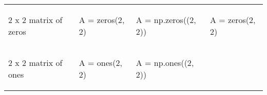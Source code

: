 \documentclass[10pt, landscape]{article}
\newenvironment{Shaded}{}{}
\newcommand{\DecValTok}[1]{\textcolor[rgb]{0.25,0.63,0.44}{{#1}}}
\newcommand{\FloatTok}[1]{\textcolor[rgb]{0.25,0.63,0.44}{{#1}}}
\newcommand{\OperatorTok}[1]{\textcolor[rgb]{0.40,0.40,0.40}{{#1}}}
\newcommand{\NormalTok}[1]{{#1}}
\begin{document}
\begin{multicols*}{2}
\begin{table}[ht]
\begin{tabular}[ ]{@{}llll@{}}
\begin{minipage}[t]{0.24\columnwidth}
2 x 2 matrix of zeros\strut
\end{minipage} & \begin{minipage}[t]{0.20\columnwidth}\raggedright\strut
\begin{Shaded}
\begin{Highlighting}[]
\NormalTok{A = zeros(}\FloatTok{2}\NormalTok{, }\FloatTok{2}\NormalTok{)}
\end{Highlighting}
\end{Shaded}
\strut
\end{minipage} & \begin{minipage}[t]{0.25\columnwidth}\raggedright\strut
\begin{Shaded}
\begin{Highlighting}[]
\NormalTok{A }\OperatorTok{=} \NormalTok{np.zeros((}\DecValTok{2}\NormalTok{, }\DecValTok{2}\NormalTok{))}
\end{Highlighting}
\end{Shaded}
\strut
\end{minipage} & \begin{minipage}[t]{0.20\columnwidth}\raggedright\strut
\begin{Shaded}
\begin{Highlighting}[]
\NormalTok{A = zeros(}\FloatTok{2}\NormalTok{, }\FloatTok{2}\NormalTok{)}
\end{Highlighting}
\end{Shaded}
\strut
\end{minipage}\tabularnewline
\begin{minipage}[t]{0.24\columnwidth}\raggedright\strut
2 x 2 matrix of ones\strut
\end{minipage} & \begin{minipage}[t]{0.20\columnwidth}\raggedright\strut
\begin{Shaded}
\begin{Highlighting}[]
\NormalTok{A = ones(}\FloatTok{2}\NormalTok{, }\FloatTok{2}\NormalTok{)}
\end{Highlighting}
\end{Shaded}
\strut
\end{minipage} & \begin{minipage}[t]{0.25\columnwidth}\raggedright\strut
\begin{Shaded}
\begin{Highlighting}[]
\NormalTok{A }\OperatorTok{=} \NormalTok{np.ones((}\DecValTok{2}\NormalTok{, }\DecValTok{2}\NormalTok{))}
\end{Highlighting}
\end{Shaded}
\strut

\end{minipage}
\end{tabular}
\end{table}
\end{multicols*}
\end{document}
